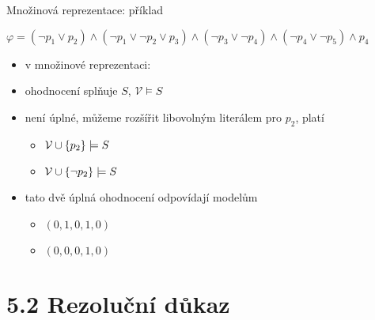 \documentclass{beamer}
\begin{document}
\begin{frame}{Množinová reprezentace: příklad}
    
    $\varphi=(\neg p_1\lor p_2)\land(\neg p_1\lor\neg p_2\lor p_3)\land(\neg p_3\lor\neg p_4)\land(\neg p_4\lor \neg p_5)\land p_4$ 
        
    \begin{itemize}
        \item v množinové reprezentaci:
        \item ohodnocení  
        splňuje $S$, \alert{$\mathcal V\models S$}
        \item není úplné, můžeme rozšířit libovolným literálem pro $p_2$, platí 
        \begin{itemize}
            \item \alert{$\mathcal V\mathbin{\cup}\{p_2\}\models S$}
            \item \alert{$\mathcal V\mathbin{\cup}\{\neg p_2\}\models S$}
        \end{itemize}        
        \item tato dvě úplná ohodnocení odpovídají modelům
         \begin{itemize}
            \item $(0,1,0,1,0)$
            \item $(0,0,0,1,0)$
         \end{itemize}
    \end{itemize}

\end{frame}


\section{5.2 Rezoluční důkaz}
\end{document}
